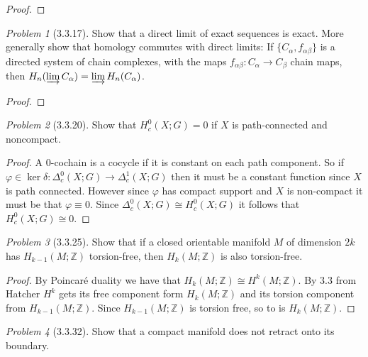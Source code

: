 \documentclass[10pt]{article}
\newcommand{\sk}{\vskip 10mm}
\newcommand{\bb}[1]{\mathbb{#1}}
\theoremstyle{remark}
\newtheorem{problem}{Problem}
\begin{document}
\begin{proof}
  
\end{proof}

\sk

\begin{problem}[3.3.17]
  Show that a direct limit of exact sequences is exact. More generally show that
  homology commutes with direct limits: If $\{C_\alpha,f_{\alpha\beta}\}$ is a
  directed system of chain complexes, with the maps
  $f_{\alpha\beta}:C_\alpha\rightarrow C_\beta$ chain maps,
  then $H_n(\varinjlim C_\alpha)=\varinjlim H_n(C_\alpha)$.
\end{problem}

\begin{proof}
  
\end{proof}

\sk

\begin{problem}[3.3.20]
  Show that $H_c^0(X;G)=0$ if $X$ is path-connected and noncompact.
\end{problem}

\begin{proof}
  A $0$-cochain is a cocycle if it is constant on each
  path component. So if $\varphi\in\ker\delta:\Delta_c^0(X;G)\rightarrow\Delta_c^1(X;G)$ then it must be a constant
  function since $X$ is path connected. However since $\varphi$ has compact
  support and $X$ is non-compact it must be that $\varphi\equiv 0$. Since
  $\Delta_c^0(X;G)\cong H_c^0(X;G)$ it follows that $H_c^0(X;G)\cong 0$.
\end{proof}

\sk

\begin{problem}[3.3.25]
  Show that if a closed orientable manifold $M$ of dimension $2k$ has
  $H_{k-1}(M;\bb{Z})$ torsion-free, then $H_k(M;\bb{Z})$ is also torsion-free.
\end{problem}

\begin{proof}
  By Poincar\'e duality we have that $H_k(M;\bb{Z})\cong H^k(M;\bb{Z})$.
  By 3.3 from Hatcher $H^k$ gets its free component form $H_k(M;\bb{Z})$ and
  its torsion component from $H_{k-1}(M;\bb{Z})$. Since $H_{k-1}(M;\bb{Z})$ is
  torsion free, so to is $H_k(M;\bb{Z})$.
\end{proof}

\sk

\begin{problem}[3.3.32]
  Show that a compact manifold does not retract onto its boundary.
\end{problem}
\end{document}
